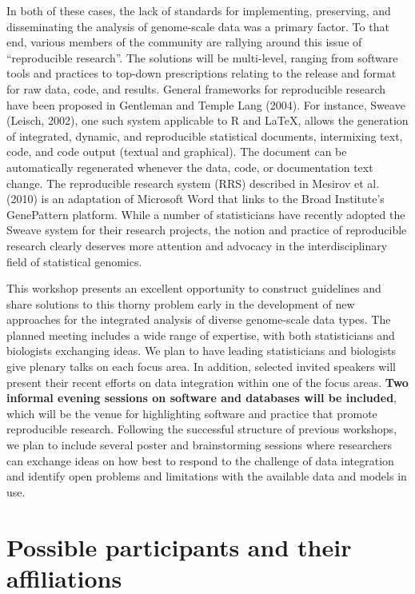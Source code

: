 \documentclass[12pt]{amsart}
\begin{document}
\begin{itemize}
  In both of these cases, the lack of standards for implementing,
  preserving, and disseminating the analysis of genome-scale data was
  a primary factor.  To that end, various members of the community are
  rallying around this issue of ``reproducible research''.  The
  solutions will be multi-level, ranging from software tools and
  practices to top-down prescriptions relating to the release and
  format for raw data, code, and results. General frameworks for
  reproducible research have been proposed in Gentleman and Temple
  Lang (2004). For instance, Sweave (Leisch, 2002), one such system
  applicable to R and \LaTeX, allows the generation of integrated,
  dynamic, and reproducible statistical documents, intermixing text,
  code, and code output (textual and graphical). The document can be
  automatically regenerated whenever the data, code, or documentation
  text change. The reproducible research system (RRS) described in
  Mesirov et al. (2010) is an adaptation of Microsoft Word that links
  to the Broad Institute's GenePattern platform.  While a number of
  statisticians have recently adopted the Sweave system for their
  research projects, the notion and practice of reproducible research
  clearly deserves more attention and advocacy in the
  interdisciplinary field of statistical genomics.
\end{itemize}

This workshop presents an excellent opportunity to construct
guidelines and share solutions to this thorny problem early in the
development of new approaches for the integrated analysis of diverse
genome-scale data types. The planned meeting includes a wide range of
expertise, with both statisticians and biologists exchanging ideas. We
plan to have leading statisticians and biologists give plenary talks
on each focus area. In addition, selected invited speakers will
present their recent efforts on data integration within one of the
focus areas. \textbf{Two informal evening sessions on software and
  databases will be included}, which will be the venue for
highlighting software and practice that promote reproducible
research. Following the successful structure of previous workshops, we
plan to include several poster and brainstorming sessions where
researchers can exchange ideas on how best to respond to the challenge
of data integration and identify open problems and limitations with
the available data and models in use.


\section*{Possible participants and their affiliations}
\end{document}
